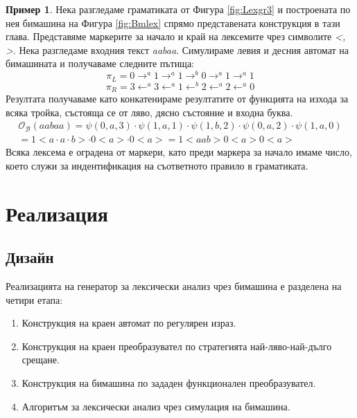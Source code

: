 \documentclass[12pt, oneside]{article}
\theoremstyle{definition}
\newtheorem{example}{Пример}[section]
\begin{document}
\begin{example}
	Нека разгледаме граматиката от Фигура \ref{fig:Lexgr3} и построената по нея бимашина на Фигура \ref{fig:Bmlex} спрямо представената конструкция в тази глава. Представяме маркерите за начало и край на лексемите чрез символите \emph{<, >}.
	Нека разгледаме входния текст \emph{aabaa}. Симулираме левия и десния автомат на бимашината и получаваме следните пътища:
	\[ \pi_L = 0 \to^{a} 1 \to^{a} 1 \to^{b} 0 \to^a 1 \to^a 1 \] 
	\[ \pi_R = 3 \leftarrow^{a} 3 \leftarrow^{a} 1 \leftarrow^{b} 2 \leftarrow^a 2 \leftarrow^a 0 \]
	Резултата получаваме като конкатенираме резултатите от функцията на изхода за всяка тройка, състояща се от ляво, дясно състояние и входна буква.
	\begin{equation}
		\begin{split}
			\mathcal{O_B}(aabaa) = \psi(0, a, 3) \cdot \psi(1, a, 1) \cdot \psi(1, b, 2) \cdot \psi(0, a, 2) \cdot \psi(1, a, 0)  \\
		= 1<a \cdot a \cdot b> \cdot 0<a> \cdot 0<a> = 1<aab>0<a>0<a>
		\end{split}
	\end{equation}
	Всяка лексема е оградена от маркери, като преди маркера за начало имаме число, което служи за индентификация на съответното правило в граматиката.
\end{example}

\pagebreak
\section{Реализация}

\subsection{Дизайн}

Реализацията на генератор за лексически анализ чрез бимашина е разделена на четири етапа:

\begin{enumerate}
	\item Конструкция на краен автомат по регулярен израз.
	\item Конструкция на краен преобразувател по стратегията най-ляво-най-дълго срещане.
	\item Конструкция на бимашина по зададен функционален преобразувател.
	\item Алгоритъм за лексически анализ чрез симулация на бимашина.
\end{enumerate}
\end{document}
